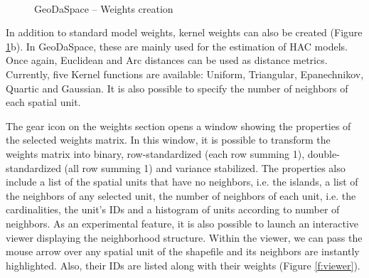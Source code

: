 \documentclass{article}
\begin{document}
\begin{figure}[htb]
\centering
\caption{GeoDaSpace -- Weights creation}
\label{f:weights}
 \\
\end{figure}

In addition to standard model weights, kernel weights can also be created (Figure \ref{f:weights}b). In GeoDaSpace, these are mainly used for the estimation of HAC models. Once again, Euclidean and Arc distances can be used as distance metrics. Currently, five Kernel functions are available: Uniform, Triangular, Epanechnikov, Quartic and Gaussian. It is also possible to specify the number of neighbors of each spatial unit.

The gear icon on the weights section opens a window showing the properties of the selected weights matrix. In this window, it is possible to transform the weights matrix into binary, row-standardized (each row summing 1), double-standardized (all row summing 1) and variance stabilized. The properties also include a list of the spatial units that have no neighbors, i.e. the islands, a list of the neighbors of any selected unit, the number of neighbors of each unit, i.e. the cardinalities, the unit's IDs and a histogram of units according to number of neighbors. As an experimental feature, it is also possible to launch an interactive viewer displaying the neighborhood structure. Within the viewer, we can pass the mouse arrow over any spatial unit of the shapefile and its neighbors are instantly highlighted. Also, their IDs are listed along with their weights (Figure \ref{f:viewer}).
\end{document}
